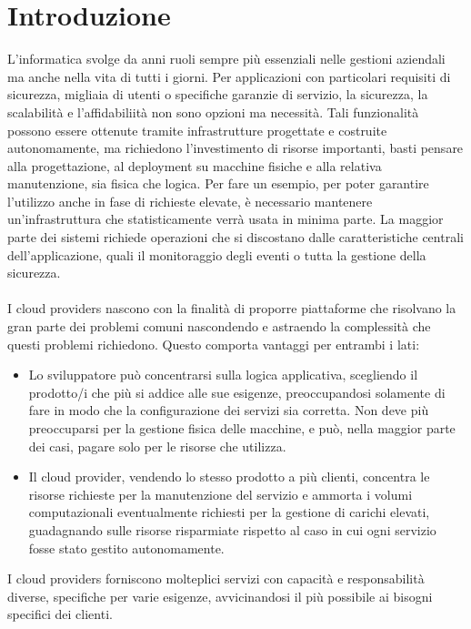 \section{Introduzione}

L'informatica svolge da anni ruoli sempre più essenziali nelle gestioni aziendali ma anche nella vita di tutti i giorni. 
Per applicazioni con particolari requisiti di sicurezza, migliaia di utenti o specifiche garanzie di servizio, la sicurezza, 
la scalabilità e l'affidabiliità non sono opzioni ma necessità. 
Tali funzionalità possono essere ottenute tramite infrastrutture progettate e costruite autonomamente, 
ma richiedono l'investimento di risorse importanti, basti pensare alla progettazione, al deployment su macchine fisiche e alla relativa manutenzione, sia fisica che logica.
Per fare un esempio, per poter garantire l'utilizzo anche in fase di richieste elevate, è necessario mantenere un'infrastruttura che statisticamente verrà usata in minima parte.
La maggior parte dei sistemi richiede operazioni che si discostano dalle caratteristiche centrali dell'applicazione, 
quali il monitoraggio degli eventi o tutta la gestione della sicurezza.\\
\\
I cloud providers nascono con la finalità di proporre piattaforme che risolvano la gran parte dei problemi comuni 
nascondendo e astraendo la complessità che questi problemi richiedono.
Questo comporta vantaggi per entrambi i lati: 
\begin{itemize}
    \item Lo sviluppatore può concentrarsi sulla logica applicativa, scegliendo il prodotto/i che più si addice alle sue esigenze, 
    preoccupandosi solamente di fare in modo che la configurazione dei servizi sia corretta. 
    Non deve più preoccuparsi per la gestione fisica delle macchine, e può, nella maggior parte dei casi, pagare solo per le risorse che utilizza.
    \item Il cloud provider, vendendo lo stesso prodotto a più clienti, concentra le risorse richieste per la manutenzione del servizio
    e ammorta i volumi computazionali eventualmente richiesti per la gestione di carichi elevati, 
    guadagnando sulle risorse risparmiate rispetto al caso in cui ogni servizio fosse stato gestito autonomamente.
\end{itemize}
    I cloud providers forniscono molteplici servizi con capacità e responsabilità diverse, specifiche per varie esigenze, 
avvicinandosi il più possibile ai bisogni specifici dei clienti.\\
